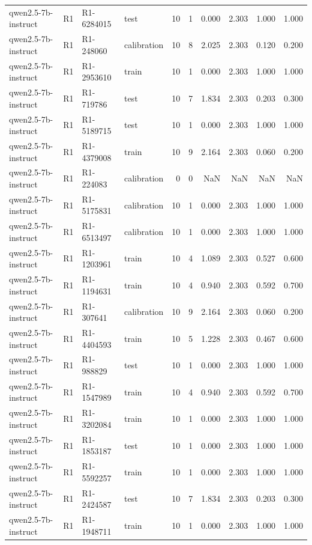 \begin{table}
\begin{tabular}{llllrrrrrr}
qwen2.5-7b-instruct & R1 & R1-6284015 & test & 10 & 1 & 0.000 & 2.303 & 1.000 & 1.000 \\
qwen2.5-7b-instruct & R1 & R1-248060 & calibration & 10 & 8 & 2.025 & 2.303 & 0.120 & 0.200 \\
qwen2.5-7b-instruct & R1 & R1-2953610 & train & 10 & 1 & 0.000 & 2.303 & 1.000 & 1.000 \\
qwen2.5-7b-instruct & R1 & R1-719786 & test & 10 & 7 & 1.834 & 2.303 & 0.203 & 0.300 \\
qwen2.5-7b-instruct & R1 & R1-5189715 & test & 10 & 1 & 0.000 & 2.303 & 1.000 & 1.000 \\
qwen2.5-7b-instruct & R1 & R1-4379008 & train & 10 & 9 & 2.164 & 2.303 & 0.060 & 0.200 \\
qwen2.5-7b-instruct & R1 & R1-224083 & calibration & 0 & 0 & NaN & NaN & NaN & NaN \\
qwen2.5-7b-instruct & R1 & R1-5175831 & calibration & 10 & 1 & 0.000 & 2.303 & 1.000 & 1.000 \\
qwen2.5-7b-instruct & R1 & R1-6513497 & calibration & 10 & 1 & 0.000 & 2.303 & 1.000 & 1.000 \\
qwen2.5-7b-instruct & R1 & R1-1203961 & train & 10 & 4 & 1.089 & 2.303 & 0.527 & 0.600 \\
qwen2.5-7b-instruct & R1 & R1-1194631 & train & 10 & 4 & 0.940 & 2.303 & 0.592 & 0.700 \\
qwen2.5-7b-instruct & R1 & R1-307641 & calibration & 10 & 9 & 2.164 & 2.303 & 0.060 & 0.200 \\
qwen2.5-7b-instruct & R1 & R1-4404593 & train & 10 & 5 & 1.228 & 2.303 & 0.467 & 0.600 \\
qwen2.5-7b-instruct & R1 & R1-988829 & test & 10 & 1 & 0.000 & 2.303 & 1.000 & 1.000 \\
qwen2.5-7b-instruct & R1 & R1-1547989 & train & 10 & 4 & 0.940 & 2.303 & 0.592 & 0.700 \\
qwen2.5-7b-instruct & R1 & R1-3202084 & train & 10 & 1 & 0.000 & 2.303 & 1.000 & 1.000 \\
qwen2.5-7b-instruct & R1 & R1-1853187 & test & 10 & 1 & 0.000 & 2.303 & 1.000 & 1.000 \\
qwen2.5-7b-instruct & R1 & R1-5592257 & train & 10 & 1 & 0.000 & 2.303 & 1.000 & 1.000 \\
qwen2.5-7b-instruct & R1 & R1-2424587 & test & 10 & 7 & 1.834 & 2.303 & 0.203 & 0.300 \\
qwen2.5-7b-instruct & R1 & R1-1948711 & train & 10 & 1 & 0.000 & 2.303 & 1.000 & 1.000 \\

\end{tabular}
\end{table}

